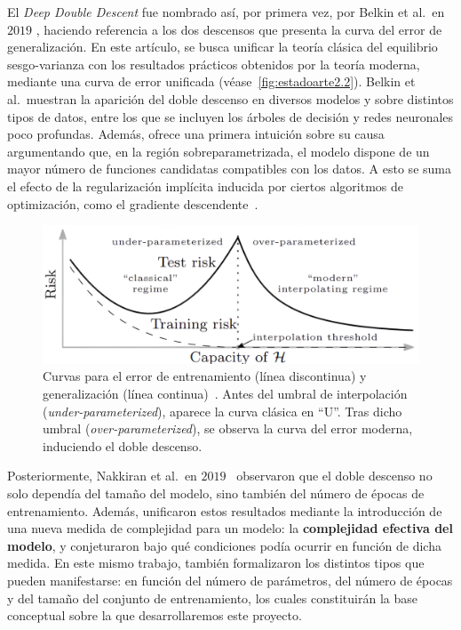 El \emph{Deep Double Descent} fue nombrado así, por primera vez, por Belkin et al.\ en $2019$ \cite{Belkin2019}, haciendo referencia a los dos descensos que presenta la curva del error de generalización. En este artículo, se busca unificar la teoría clásica del equilibrio sesgo-varianza con los resultados prácticos obtenidos por la teoría moderna, mediante una curva de error unificada (véase~\autoref{fig:estadoarte2.2}). Belkin et al.\ muestran la aparición del doble descenso en diversos modelos y sobre distintos tipos de datos, entre los que se incluyen los árboles de decisión y redes neuronales poco profundas. Además, ofrece una primera intuición sobre su causa argumentando que, en la región sobreparametrizada, el modelo dispone de un mayor número de funciones candidatas compatibles con los datos. A esto se suma el efecto de la regularización implícita inducida por ciertos algoritmos de optimización, como el gradiente descendente~\cite{Soudry2024}.

\begin{figure}[h]
    \centering
    \includegraphics[width=0.8\linewidth]{img/estadoarte2.2.png}
    \caption[Curva del error unificada entre la teoría clásica y moderna~\cite{Belkin2019}.]{Curvas para el error de entrenamiento (línea discontinua) y generalización (línea continua)~\cite{Belkin2019}. Antes del umbral de interpolación (\textit{under-parameterized}), aparece la curva clásica en ``U''. Tras dicho umbral (\textit{over-parameterized}), se observa la curva del error moderna, induciendo el doble descenso.}\label{fig:estadoarte2.2}
\end{figure}

Posteriormente, Nakkiran et al.\ en $2019$~\cite{Nakkiran2019} observaron que el doble descenso no solo dependía del tamaño del modelo, sino también del número de épocas de entrenamiento. Además, unificaron estos resultados mediante la introducción de una nueva medida de complejidad para un modelo: la \textbf{complejidad efectiva del modelo}, y conjeturaron bajo qué condiciones podía ocurrir en función de dicha medida. En este mismo trabajo, también formalizaron los distintos tipos que pueden manifestarse: en función del número de parámetros, del número de épocas y del tamaño del conjunto de entrenamiento, los cuales constituirán la base conceptual sobre la que desarrollaremos este proyecto.

